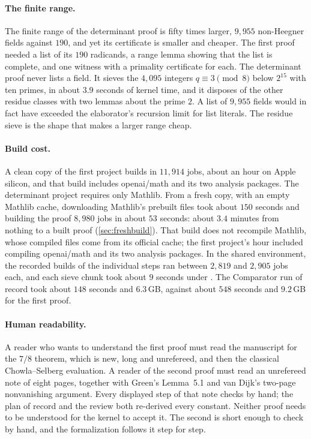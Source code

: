 \documentclass[11pt]{article}
\theoremstyle{definition}
\begin{document}
\paragraph{The finite range.} The finite range of the determinant proof is fifty times larger, $9{,}955$ non-Heegner fields against $190$, and yet its certificate is smaller and cheaper. The first proof needed a list of its $190$ radicands, a range lemma showing that the list is complete, and one witness with a primality certificate for each. The determinant proof never lists a field. It sieves the $4{,}095$ integers $q \equiv 3 \pmod 8$ below $2^{15}$ with ten primes, in about $3.9$ seconds of kernel time, and it disposes of the other residue classes with two lemmas about the prime $2$. A list of $9{,}955$ fields would in fact have exceeded the elaborator's recursion limit for list literals. The residue sieve is the shape that makes a larger range cheap.

\paragraph{Build cost.} A clean copy of the first project builds in $11{,}914$ jobs, about an hour on Apple silicon, and that build includes openai/math and its two analysis packages. The determinant project requires only Mathlib. From a fresh copy, with an empty Mathlib cache, downloading Mathlib's prebuilt files took about $150$ seconds and building the proof $8{,}980$ jobs in about $53$ seconds: about $3.4$ minutes from nothing to a built proof (\cref{sec:freshbuild}). That build does not recompile Mathlib, whose compiled files come from its official cache; the first project's hour included compiling openai/math and its two analysis packages. In the shared environment, the recorded builds of the individual steps ran between $2{,}819$ and $2{,}905$ jobs each, and each sieve chunk took about $9$ seconds under . The Comparator run of record took about $148$ seconds and $6.3$\,GB, against about $548$ seconds and $9.2$\,GB for the first proof.

\paragraph{Human readability.} A reader who wants to understand the first proof must read the manuscript for the $7/8$ theorem, which is new, long and unrefereed, and then the classical Chowla--Selberg evaluation. A reader of the second proof must read an unrefereed note of eight pages, together with Green's Lemma~5.1 and van Dijk's two-page nonvanishing argument. Every displayed step of that note checks by hand; the plan of record and the review both re-derived every constant. Neither proof needs to be understood for the kernel to accept it. The second is short enough to check by hand, and the formalization follows it step for step.
\end{document}
